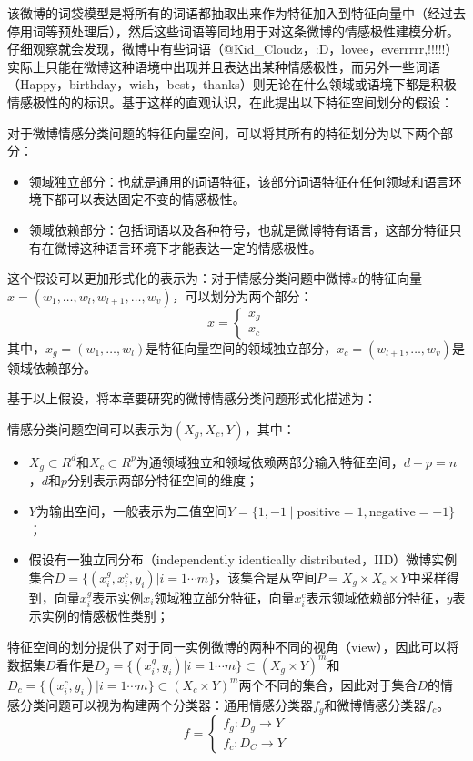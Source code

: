 该微博的词袋模型是将所有的词语都抽取出来作为特征加入到特征向量中（经过去停用词等预处理后），然后这些词语等同地用于对这条微博的情感极性建模分析。仔细观察就会发现，微博中有些词语（@Kid\_Cloudz，:D，lovee，everrrrr,!!!!!）实际上只能在微博这种语境中出现并且表达出某种情感极性，而另外一些词语（Happy，birthday，wish，best，thanks）则无论在什么领域或语境下都是积极情感极性的的标识。基于这样的直观认识，在此提出以下特征空间划分的假设：
\begin{assumption}[特征空间划分]
\label{hy4-1}
对于微博情感分类问题的特征向量空间，可以将其所有的特征划分为以下两个部分：
\begin{itemize}
\item 领域独立部分：也就是通用的词语特征，该部分词语特征在任何领域和语言环境下都可以表达固定不变的情感极性。
\item 领域依赖部分：包括词语以及各种符号，也就是微博特有语言，这部分特征只有在微博这种语言环境下才能表达一定的情感极性。
\end{itemize}
\end{assumption}
这个假设可以更加形式化的表示为：对于情感分类问题中微博$ x $的特征向量$ x=\left(  w_{1},\dots,w_{l},w_{l+1},\dots,w_{v} \right) $，可以划分为两个部分：
\begin{equation}
\label{e2}
x=\begin{cases}
x_{g}\\
x_{c}
\end{cases}
\end{equation}
其中，$ x_{g}= \left( w_{1},\dots,w_{l}\right) $是特征向量空间的领域独立部分，$ x_{c}= \left( w_{l+1},\dots,w_{v}\right) $是领域依赖部分。

基于以上假设，将本章要研究的微博情感分类问题形式化描述为：
\begin{definition}[基于特征空间划分的情感分类]
情感分类问题空间可以表示为$(X_{g},X_{c},Y)$，其中：
\begin{itemize}
\item $ X_{g}\subset R^d$和$ X_{c}\subset R^p$为通领域独立和领域依赖两部分输入特征空间，$d+p=n$，$ d $和$ p $分别表示两部分特征空间的维度；
\item $Y$为输出空间，一般表示为二值空间$ Y=\lbrace 1,-1\mid \mathrm{positive}=1,\mathrm{negative}=-1 \rbrace$；
\item 假设有一独立同分布（independently identically distributed，IID）微博实例集合$D=\{(x_i^g,x_i^c,y_i)|i=1\cdots m\}$，该集合是从空间$P=X_g \times X_c \times Y$中采样得到，向量$x_i^g$表示实例$ x_i $领域独立部分特征，向量$x_i^c$表示领域依赖部分特征，$y$表示实例的情感极性类别；
\end{itemize}
特征空间的划分提供了对于同一实例微博的两种不同的视角（view），因此可以将数据集$D$看作是$D_g=\{(x_i^g,y_i)|i=1\cdots m\} \subset (X_g \times Y)^m$和$D_c=\{(x_i^c,y_i)|i=1\cdots m\} \subset (X_c \times Y)^m$两个不同的集合，因此对于集合$D$的情感分类问题可以视为构建两个分类器：通用情感分类器$ f_g $和微博情感分类器$ f_c $。
\begin{equation}
f=
\begin{cases}
f_g:D_g \rightarrow Y\\
f_c:D_C \rightarrow Y
\end{cases}
\end{equation}
\end{definition}

